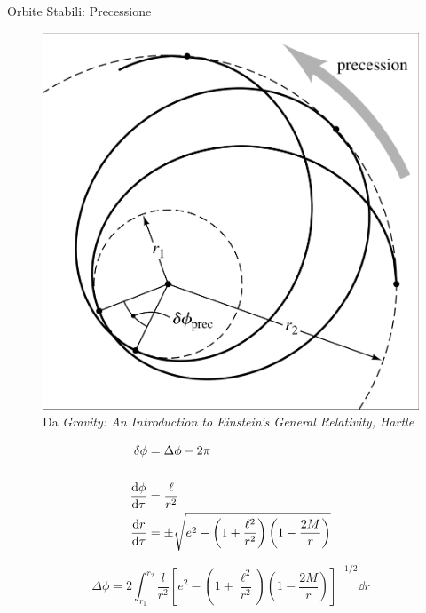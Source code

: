 \begin{frame}{Orbite Stabili: Precessione}

    \begin{minipage}{0.4 \textwidth}
        \begin{figure}
            \centering
            \includegraphics[width= 0.9 \textwidth]{Figures/ch1/precession_bozza.png}
            \caption{Da \textit{Gravity: An Introduction to Einstein's General Relativity, Hartle}}
        \end{figure}
    \end{minipage}
    \begin{minipage}{0.6 \textwidth}
        \begin{align*}
            \delta \phi &= \Delta \phi - 2 \pi \\ \\
            \dv{\phi}{\tau} &= \frac{\ell}{r^2} \\
            \dv{r}{\tau} &= \pm \sqrt{e^2 - \left(1 + \frac{\ell^2}{r^2}\right)
            \left(1 - \frac{2M}{r}\right)}
        \end{align*}
    \end{minipage}

    \begin{equation*}
        \Delta \phi = 2 \int_{r_1}^{r_2} \frac{l}{r^2}
        \left[e^2 - \left(1 + \frac{\ell^2}{r^2}\right)
        \left(1 - \frac{2M}{r}\right)\right]^{-1/2} \dd r
    \end{equation*}

\end{frame}


